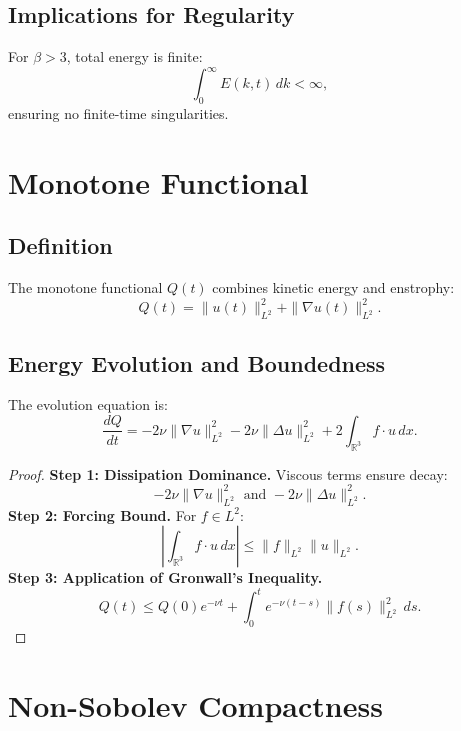 \subsection{Implications for Regularity}
For $\beta > 3$, total energy is finite:
\begin{equation}
\int_0^\infty E(k, t) \, dk < \infty,
\end{equation}
ensuring no finite-time singularities.

\section{Monotone Functional}

\subsection{Definition}
The monotone functional $Q(t)$ combines kinetic energy and enstrophy:
\begin{equation}
Q(t) = \|u(t)\|_{L^2}^2 + \|\nabla u(t)\|_{L^2}^2.
\end{equation}

\subsection{Energy Evolution and Boundedness}
The evolution equation is:
\begin{equation}
\frac{dQ}{dt} = -2\nu \|\nabla u\|_{L^2}^2 - 2\nu \|\Delta u\|_{L^2}^2 + 2\int_{\mathbb{R}^3} f \cdot u \, dx.
\end{equation}

\begin{proof}
\textbf{Step 1: Dissipation Dominance.} Viscous terms ensure decay:
\begin{equation}
-2\nu \|\nabla u\|_{L^2}^2 \text{ and } -2\nu \|\Delta u\|_{L^2}^2.
\end{equation}
\textbf{Step 2: Forcing Bound.} For $f \in L^2$:
\begin{equation}
\left| \int_{\mathbb{R}^3} f \cdot u \, dx \right| \leq \|f\|_{L^2} \|u\|_{L^2}.
\end{equation}
\textbf{Step 3: Application of Gronwall's Inequality.}
\begin{equation}
Q(t) \leq Q(0)e^{-\nu t} + \int_0^t e^{-\nu (t-s)} \|f(s)\|_{L^2}^2 \, ds.
\end{equation}
\end{proof}

\section{Non-Sobolev Compactness}

